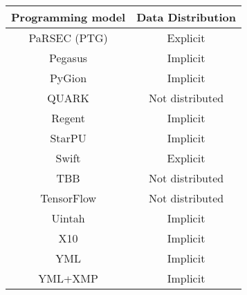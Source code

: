 \begin{tabular}{cc}
\hline
Programming model & Data Distribution \\
\hline
PaRSEC (PTG) & Explicit\\
Pegasus & Implicit\\
PyGion & Implicit\\
QUARK & Not distributed\\
Regent & Implicit\\
StarPU & Implicit\\
Swift & Explicit\\
TBB & Not distributed\\
TensorFlow & Not distributed\\
Uintah & Implicit\\
X10 & Implicit\\
YML & Implicit\\
YML+XMP & Implicit\\
\hline
\end{tabular}
